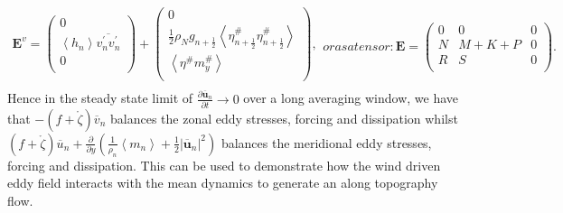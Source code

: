\documentclass[12pt,a4paper]{report}
\newcommand*\thkmean[1]{\overline{#1}}
\newcommand*\thkres[1]{{#1}^{\prime}}
\newcommand*\nthkmean[1]{\left\langle{#1}\right\rangle}
\newcommand*\nthkres[1]{{#1}^{\#}}
\newcommand*\spec[1]{\mathring{#1}}
\newcommand*{\half}{\frac{1}{2}}
\newcommand*{\partialdiff}[2][{}]{\frac{\partial #1}{\partial #2}}
\begin{document}
\begin{subequations}
\begin{equation}
\begin{array}{c}
	\boldsymbol{E}^{v}=\left(
	\begin{array}{c}
	0 \\
	\nthkmean{h_{n}}\thkmean{\thkres{v}_{n}\thkres{v}_{n}} \\
	0 \\
	\end{array}\right)+\left(
	\begin{array}{c}
	0\\
	\half\rho_{N}g_{n+\half} \nthkmean{\nthkres{\eta}_{n+\half}\nthkres{\eta}_{n+\half}} \\
	\nthkmean{\nthkres{\eta}\nthkres{m}_{y}} \\
	\end{array}\right), \\
	\end{array}
	\end{equation}
	or as a tensor:
	\begin{equation}
	\boldsymbol{E}=\left(\begin{array}{ccc}
	0 & 0 & 0 \\
	N & M + K + P& 0 \\
	R & S & 0 \\
	\end{array}\right).
	\end{equation}
\end{subequations}
Hence in the steady state limit of $\partialdiff[\thkmean{\boldsymbol{u}}_{n}]{t} \xrightarrow{} 0$ over a long averaging window, we have that $-(f+\spec{\zeta})\thkmean{v}_{n}$
balances the zonal eddy stresses, forcing and dissipation whilst 
 $(f+\spec{\zeta})\thkmean{u}_{n} +  \frac{\partial }{\partial y}\left(\frac{1}{\rho_{n}}\nthkmean{m_{n}}+\half \left|\thkmean{\boldsymbol{u}}_{n}\right|^{2}\right)$ balances the meridional 
 eddy stresses, forcing and dissipation. This can be used to demonstrate how the 
 wind driven eddy field interacts with the mean dynamics to generate an along topography
 flow. 
 
\end{document}
